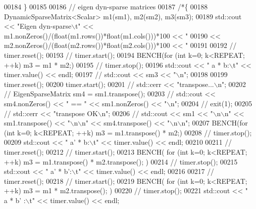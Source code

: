 \begin{DoxyCode}
{{{00184     \}
00185 
00186     \textcolor{comment}{// eigen dyn-sparse matrices}
00187     \textcolor{comment}{/*\{}
00188 \textcolor{comment}{      DynamicSparseMatrix<Scalar> m1(sm1), m2(sm2), m3(sm3);}
00189 \textcolor{comment}{      std::cout << "Eigen dyn-sparse\(\backslash\)t" << m1.nonZeros()/(float(m1.rows())*float(m1.cols()))*100 << "%
00190 \textcolor{comment}{                << m2.nonZeros()/(float(m2.rows())*float(m2.cols()))*100 << "%
00191 \textcolor{comment}{}
00192 \textcolor{comment}{//       timer.reset();}
00193 \textcolor{comment}{//       timer.start();}
00194 \textcolor{comment}{      BENCH(for (int k=0; k<REPEAT; ++k) m3 = m1 * m2;)}
00195 \textcolor{comment}{//       timer.stop();}
00196 \textcolor{comment}{      std::cout << "   a * b:\(\backslash\)t" << timer.value() << endl;}
00197 \textcolor{comment}{//       std::cout << sm3 << "\(\backslash\)n";}
00198 \textcolor{comment}{}
00199 \textcolor{comment}{      timer.reset();}
00200 \textcolor{comment}{      timer.start();}
00201 \textcolor{comment}{//       std::cerr << "transpose...\(\backslash\)n";}
00202 \textcolor{comment}{//       EigenSparseMatrix sm4 = sm1.transpose();}
00203 \textcolor{comment}{//       std::cout << sm4.nonZeros() << " == " << sm1.nonZeros() << "\(\backslash\)n";}
00204 \textcolor{comment}{//       exit(1);}
00205 \textcolor{comment}{//       std::cerr << "transpose OK\(\backslash\)n";}
00206 \textcolor{comment}{//       std::cout << sm1 << "\(\backslash\)n\(\backslash\)n" << sm1.transpose() << "\(\backslash\)n\(\backslash\)n" << sm4.transpose() << "\(\backslash\)n\(\backslash\)n";}
00207 \textcolor{comment}{      BENCH(for (int k=0; k<REPEAT; ++k) m3 = m1.transpose() * m2;)}
00208 \textcolor{comment}{//       timer.stop();}
00209 \textcolor{comment}{      std::cout << "   a' * b:\(\backslash\)t" << timer.value() << endl;}
00210 \textcolor{comment}{}
00211 \textcolor{comment}{//       timer.reset();}
00212 \textcolor{comment}{//       timer.start();}
00213 \textcolor{comment}{      BENCH( for (int k=0; k<REPEAT; ++k) m3 = m1.transpose() * m2.transpose(); )}
00214 \textcolor{comment}{//       timer.stop();}
00215 \textcolor{comment}{      std::cout << "   a' * b':\(\backslash\)t" << timer.value() << endl;}
00216 \textcolor{comment}{}
00217 \textcolor{comment}{//       timer.reset();}
00218 \textcolor{comment}{//       timer.start();}
00219 \textcolor{comment}{      BENCH( for (int k=0; k<REPEAT; ++k) m3 = m1 * m2.transpose(); )}
00220 \textcolor{comment}{//       timer.stop();}
00221 \textcolor{comment}{      std::cout << "   a * b' :\(\backslash\)t" << timer.value() << endl;}
}}}}}
\end{DoxyCode}
